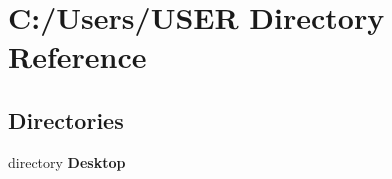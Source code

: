 \section{C\+:/\+Users/\+U\+S\+ER Directory Reference}
\label{dir_4c7bed6e7bf673a77dbc110eeb374297}
\subsection*{Directories}
\begin{DoxyCompactItemize}
\item 
directory \textbf{ Desktop}
\end{DoxyCompactItemize}
